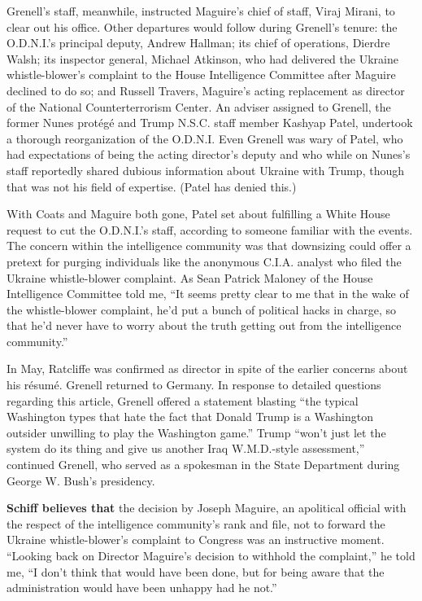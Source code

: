 Grenell's staff, meanwhile, instructed Maguire's chief of staff, Viraj
Mirani, to clear out his office. Other departures would follow during
Grenell's tenure: the O.D.N.I.'s principal deputy, Andrew Hallman; its
chief of operations, Dierdre Walsh; its inspector general, Michael
Atkinson, who had delivered the Ukraine whistle-blower's complaint to
the House Intelligence Committee after Maguire declined to do so; and
Russell Travers, Maguire's acting replacement as director of the
National Counterterrorism Center. An adviser assigned to Grenell, the
former Nunes protégé and Trump N.S.C. staff member Kashyap Patel,
undertook a thorough reorganization of the O.D.N.I. Even Grenell was
wary of Patel, who had expectations of being the acting director's
deputy and who while on Nunes's staff reportedly shared dubious
information about Ukraine with Trump, though that was not his field of
expertise. (Patel has denied this.)

With Coats and Maguire both gone, Patel set about fulfilling a White
House request to cut the O.D.N.I.'s staff, according to someone familiar
with the events. The concern within the intelligence community was that
downsizing could offer a pretext for purging individuals like the
anonymous C.I.A. analyst who filed the Ukraine whistle-blower complaint.
As Sean Patrick Maloney of the House Intelligence Committee told me,
``It seems pretty clear to me that in the wake of the whistle-blower
complaint, he'd put a bunch of political hacks in charge, so that he'd
never have to worry about the truth getting out from the intelligence
community.''

In May, Ratcliffe was confirmed as director in spite of the earlier
concerns about his résumé. Grenell returned to Germany. In response to
detailed questions regarding this article, Grenell offered a statement
blasting ``the typical Washington types that hate the fact that Donald
Trump is a Washington outsider unwilling to play the Washington game.''
Trump ``won't just let the system do its thing and give us another Iraq
W.M.D.-style assessment,'' continued Grenell, who served as a spokesman
in the State Department during George W. Bush's presidency.

\textbf{Schiff believes that} the decision by Joseph Maguire, an
apolitical official with the respect of the intelligence community's
rank and file, not to forward the Ukraine whistle-blower's complaint to
Congress was an instructive moment. ``Looking back on Director Maguire's
decision to withhold the complaint,'' he told me, ``I don't think that
would have been done, but for being aware that the administration would
have been unhappy had he not.''


